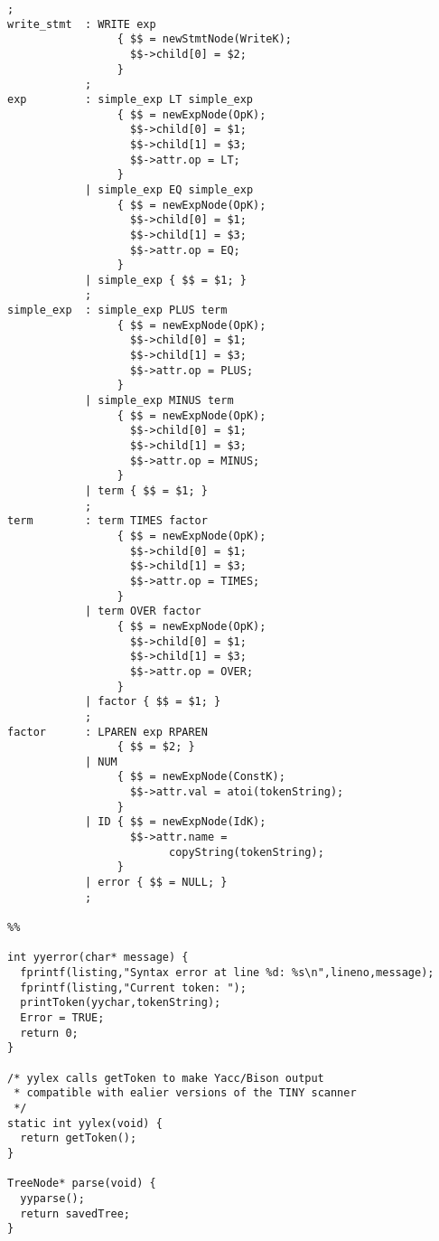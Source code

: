 \documentclass[lang=cn,10pt]{elegantbook}
\begin{document}
\begin{lstlisting}[caption={tiny.y}]
            ;
write_stmt  : WRITE exp
                 { $$ = newStmtNode(WriteK);
                   $$->child[0] = $2;
                 }
            ;
exp         : simple_exp LT simple_exp 
                 { $$ = newExpNode(OpK);
                   $$->child[0] = $1;
                   $$->child[1] = $3;
                   $$->attr.op = LT;
                 }
            | simple_exp EQ simple_exp
                 { $$ = newExpNode(OpK);
                   $$->child[0] = $1;
                   $$->child[1] = $3;
                   $$->attr.op = EQ;
                 }
            | simple_exp { $$ = $1; }
            ;
simple_exp  : simple_exp PLUS term 
                 { $$ = newExpNode(OpK);
                   $$->child[0] = $1;
                   $$->child[1] = $3;
                   $$->attr.op = PLUS;
                 }
            | simple_exp MINUS term
                 { $$ = newExpNode(OpK);
                   $$->child[0] = $1;
                   $$->child[1] = $3;
                   $$->attr.op = MINUS;
                 } 
            | term { $$ = $1; }
            ;
term        : term TIMES factor 
                 { $$ = newExpNode(OpK);
                   $$->child[0] = $1;
                   $$->child[1] = $3;
                   $$->attr.op = TIMES;
                 }
            | term OVER factor
                 { $$ = newExpNode(OpK);
                   $$->child[0] = $1;
                   $$->child[1] = $3;
                   $$->attr.op = OVER;
                 }
            | factor { $$ = $1; }
            ;
factor      : LPAREN exp RPAREN
                 { $$ = $2; }
            | NUM
                 { $$ = newExpNode(ConstK);
                   $$->attr.val = atoi(tokenString);
                 }
            | ID { $$ = newExpNode(IdK);
                   $$->attr.name =
                         copyString(tokenString);
                 }
            | error { $$ = NULL; }
            ;

%%

int yyerror(char* message) {
  fprintf(listing,"Syntax error at line %d: %s\n",lineno,message);
  fprintf(listing,"Current token: ");
  printToken(yychar,tokenString);
  Error = TRUE;
  return 0;
}

/* yylex calls getToken to make Yacc/Bison output
 * compatible with ealier versions of the TINY scanner
 */
static int yylex(void) {
  return getToken();
}

TreeNode* parse(void) {
  yyparse();
  return savedTree;
}
\end{lstlisting}
\end{document}
